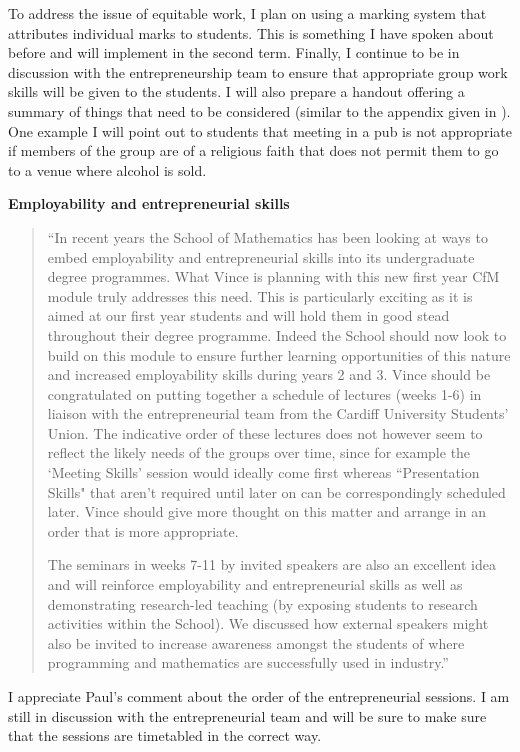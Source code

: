 \documentclass{article}
\begin{document}
To address the issue of equitable work, I plan on using a marking system that attributes individual marks to students. This is something I have spoken about before and will implement in the second term. Finally, I continue to be in discussion with the entrepreneurship team to ensure that appropriate group work skills will be given to the students. I will also prepare a handout offering a summary of things that need to be considered (similar to the appendix given in \cite{hilton_instructor-assigned_2010}). One example I will point out to students that meeting in a pub is not appropriate if members of the group are of a religious faith that does not permit them to go to a venue where alcohol is sold.

\textbf{Employability and entrepreneurial skills}

\begin{quote}
``In recent years the School of Mathematics has been looking at ways to embed employability and entrepreneurial skills into its undergraduate degree programmes. What Vince is planning with this new first year CfM module truly addresses this need. This is particularly exciting as it is aimed at our first year students and will hold them in good stead throughout their degree programme. Indeed the School should now look to build on this module to ensure further learning opportunities of this nature and increased employability skills during years 2 and 3. Vince should be congratulated on putting together a schedule of lectures (weeks 1-6) in liaison with the entrepreneurial team from the Cardiff University Students’ Union. The indicative order of these lectures does not however seem to reflect the likely needs of the groups over time, since for example the `Meeting Skills' session would ideally come first whereas ``Presentation Skills" that aren't required until later on can be correspondingly scheduled later. Vince should give more thought on this matter and arrange in an order that is more appropriate.

The seminars in weeks 7-11 by invited speakers are also an excellent idea and will reinforce employability and entrepreneurial skills as well as demonstrating research-led teaching (by exposing students to research activities within the School). We discussed how external speakers might also be invited to increase awareness amongst the students of where programming and mathematics are successfully used in industry.''
\end{quote}

I appreciate Paul's comment about the order of the entrepreneurial sessions. I am still in discussion with the entrepreneurial team and will be sure to make sure that the sessions are timetabled in the correct way.
\end{document}
